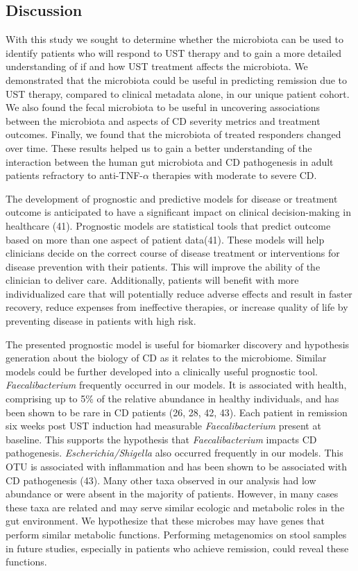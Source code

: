 \documentclass[12pt,]{article}
\begin{document}
\subsection{Discussion}\label{discussion}

With this study we sought to determine whether the microbiota can be
used to identify patients who will respond to UST therapy and to gain a
more detailed understanding of if and how UST treatment affects the
microbiota. We demonstrated that the microbiota could be useful in
predicting remission due to UST therapy, compared to clinical metadata
alone, in our unique patient cohort. We also found the fecal microbiota
to be useful in uncovering associations between the microbiota and
aspects of CD severity metrics and treatment outcomes. Finally, we found
that the microbiota of treated responders changed over time. These
results helped us to gain a better understanding of the interaction
between the human gut microbiota and CD pathogenesis in adult patients
refractory to anti-TNF-\({\alpha}\) therapies with moderate to severe
CD.

The development of prognostic and predictive models for disease or
treatment outcome is anticipated to have a significant impact on
clinical decision-making in healthcare (41). Prognostic models are
statistical tools that predict outcome based on more than one aspect of
patient data(41). These models will help clinicians decide on the
correct course of disease treatment or interventions for disease
prevention with their patients. This will improve the ability of the
clinician to deliver care. Additionally, patients will benefit with more
individualized care that will potentially reduce adverse effects and
result in faster recovery, reduce expenses from ineffective therapies,
or increase quality of life by preventing disease in patients with high
risk.

The presented prognostic model is useful for biomarker discovery and
hypothesis generation about the biology of CD as it relates to the
microbiome. Similar models could be further developed into a clinically
useful prognostic tool. \emph{Faecalibacterium} frequently occurred in
our models. It is associated with health, comprising up to 5\% of the
relative abundance in healthy individuals, and has been shown to be rare
in CD patients (26, 28, 42, 43). Each patient in remission six weeks
post UST induction had measurable \emph{Faecalibacterium} present at
baseline. This supports the hypothesis that \emph{Faecalibacterium}
impacts CD pathogenesis. \emph{Escherichia/Shigella} also occurred
frequently in our models. This OTU is associated with inflammation and
has been shown to be associated with CD pathogenesis (43). Many other
taxa observed in our analysis had low abundance or were absent in the
majority of patients. However, in many cases these taxa are related and
may serve similar ecologic and metabolic roles in the gut environment.
We hypothesize that these microbes may have genes that perform similar
metabolic functions. Performing metagenomics on stool samples in future
studies, especially in patients who achieve remission, could reveal
these functions.
\end{document}

